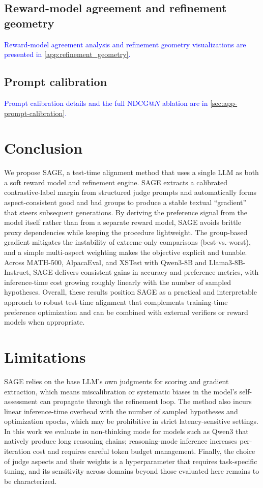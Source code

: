 \documentclass[11pt]{article}
\theoremstyle{plain}
\theoremstyle{definition}
\theoremstyle{remark}
\newcommand{\method}{SAGE}
\begin{document}
\subsection{Reward-model agreement and refinement geometry}
\textcolor{blue}{\noindent Reward-model agreement analysis and refinement geometry visualizations are presented in \cref{app:refinement_geometry}.}

\subsection{Prompt calibration}
\label{sec:prompt-calibration-trick}
\textcolor{blue}{\noindent Prompt calibration details and the full NDCG@\(N\) ablation are in \cref{sec:app-prompt-calibration}.}

\section{Conclusion}
\noindent We propose \method{}, a test-time alignment method that uses a single LLM as both a soft reward model and refinement engine. \method{} extracts a calibrated contrastive-label margin from structured judge prompts and automatically forms aspect-consistent good and bad groups to produce a stable textual ``gradient'' that steers subsequent generations. By deriving the preference signal from the model itself rather than from a separate reward model, \method{} avoids brittle proxy dependencies while keeping the procedure lightweight. The group-based gradient mitigates the instability of extreme-only comparisons (best-vs.-worst), and a simple multi-aspect weighting makes the objective explicit and tunable. Across MATH-500, AlpacaEval, and XSTest with Qwen3-8B and Llama3-8B-Instruct, \method{} delivers consistent gains in accuracy and preference metrics, with inference-time cost growing roughly linearly with the number of sampled hypotheses. Overall, these results position \method{} as a practical and interpretable approach to robust test-time alignment that complements training-time preference optimization and can be combined with external verifiers or reward models when appropriate.

\section*{Limitations}
\noindent \method{} relies on the base LLM's own judgments for scoring and gradient extraction, which means miscalibration or systematic biases in the model's self-assessment can propagate through the refinement loop. The method also incurs linear inference-time overhead with the number of sampled hypotheses and optimization epochs, which may be prohibitive in strict latency-sensitive settings. In this work we evaluate in non-thinking mode for models such as Qwen3 that natively produce long reasoning chains; reasoning-mode inference increases per-iteration cost and requires careful token budget management. Finally, the choice of judge aspects and their weights is a hyperparameter that requires task-specific tuning, and its sensitivity across domains beyond those evaluated here remains to be characterized.
\end{document}
